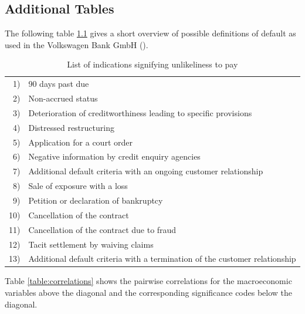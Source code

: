 \documentclass[a4paper, 11pt]{scrreprt}
\begin{document}
\begin{appendices}
	
\chapter{Additional Tables}

The following table \ref{defaultindications} gives a short overview of possible definitions of default as used in the Volkswagen Bank GmbH (\textcite[p. 52]{ivanchenko2017predicting}).
\begin{table}[H]
 \centering
		\begin{tabular}{rl}
			1)  & 90 days past due  \\
			2)  & Non-accrued status \\
			3)  & Deterioration of creditworthiness leading to specific provisions \\
			4)  & Distressed restructuring \\
			5)  & Application for a court order \\
			6)  & Negative information by credit enquiry agencies \\
			7)  & Additional default criteria with an ongoing customer relationship  \\
			8)  & Sale of exposure with a loss \\
			9)  & Petition or declaration of bankruptcy \\
			10) & Cancellation of the contract \\
			11) & Cancellation of the contract due to fraud \\
			12) & Tacit settlement by waiving claims \\
			13) & Additional default criteria with a termination of the customer relationship
		\end{tabular}
		\caption{List of indications signifying unlikeliness to pay}
		\label{defaultindications}
\end{table}

\medskip
Table \ref{table:correlations} shows the pairwise correlations for the macroeconomic variables above the diagonal and the corresponding significance codes below the diagonal. 


\end{appendices}
\end{document}
